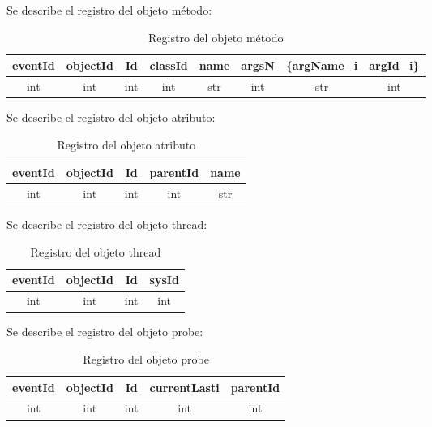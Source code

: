 \documentclass[10pt,a4paper]{article}
\begin{document}
\newpage
Se describe el registro del objeto método:\\

\begin{table}[!h]
\begin{center}
\begin{tabular}{| c | c | c | c | c | c | c | c |}
\hline
eventId & objectId & Id & classId & name & argsN & \{argName_{i} & argId_{i}\}\\
\hline
int & int & int & int & str & int & str & int \\
\hline
\end{tabular}
\caption{Registro del objeto método} 
\end{center}
\end{table}


Se describe el registro del objeto atributo:\\

\begin{table}[!h]
\begin{center}
\begin{tabular}{| c | c | c | c | c |}
\hline
eventId & objectId & Id & parentId & name\\
\hline
int & int & int & int & str\\
\hline
\end{tabular}
\caption{Registro del objeto atributo} 
\end{center}
\end{table}


Se describe el registro del objeto thread: \\

\begin{table}[!h]
\begin{center}
\begin{tabular}{| c | c | c | c |}
\hline
eventId & objectId & Id & sysId\\
\hline
int & int & int & int\\
\hline
\end{tabular}
\caption{Registro del objeto thread} 
\end{center}
\end{table}


Se describe el registro del objeto probe: \\

\begin{table}[!h]
\begin{center}
\begin{tabular}{| c | c | c | c | c |}
\hline
eventId & objectId & Id & currentLasti & parentId\\
\hline
int & int & int & int & int\\
\hline
\end{tabular}
\caption{Registro del objeto probe} 
\end{center}
\end{table}
\end{document}
